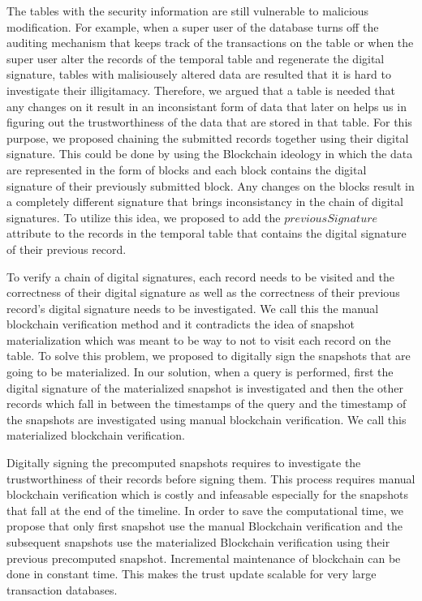 		The tables with the security information are still vulnerable to malicious modification. For example, when a super user of the database turns off the auditing mechanism that keeps track of the transactions on the table or when the super user alter the records of the temporal table and regenerate the digital signature, tables with malisiousely altered data are resulted that it is hard to investigate their illigitamacy. Therefore, we argued that a table is needed that any changes on it result in an inconsistant form of data that later on helps us in figuring out the trustworthiness of the data that are stored in that table. For this purpose, we proposed chaining the submitted records together using their digital signature. This could be done by using the Blockchain ideology in which the data are represented in the form of blocks and each block contains the digital signature of their previously submitted block. Any changes on the blocks result in a completely different signature that brings inconsistancy in the chain of digital signatures. To utilize this idea, we proposed to add the $previousSignature$ attribute to the records in the temporal table that contains the digital signature of their previous record.

		To verify a chain of digital signatures, each record needs to be visited and the correctness of their digital signature as well as the correctness of their previous record's digital signature needs to be investigated. We call this the manual blockchain verification method and it contradicts the idea of snapshot materialization which was meant to be way to not to visit each record on the table. To solve this problem, we proposed to digitally sign the snapshots that are going to be materialized. In our solution, when a query is performed, first the digital signature of the materialized snapshot is investigated and then the other records which fall in between the timestamps of the query and the timestamp of the snapshots are investigated using manual blockchain verification. We call this materialized blockchain verification.
		
		Digitally signing the precomputed snapshots requires to investigate the trustworthiness of their records before signing them. This process requires manual blockchain verification which is costly and infeasable especially for the snapshots that fall at the end of the timeline. In order to save the computational time, we propose that only first snapshot use the manual Blockchain verification and the subsequent snapshots use the materialized Blockchain verification using their previous precomputed snapshot. Incremental maintenance of blockchain can be done in constant time. This makes the trust update scalable for very large transaction databases.
